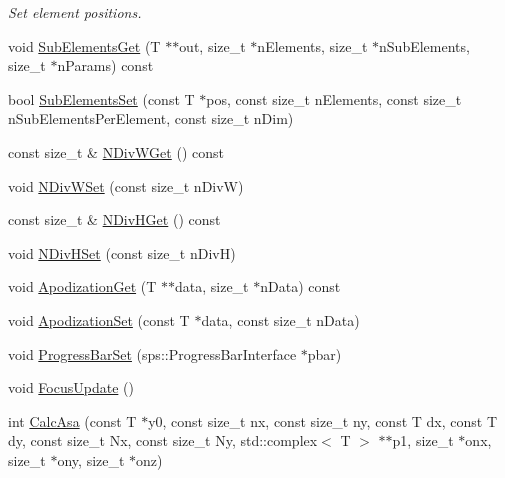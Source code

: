 \begin{DoxyCompactItemize}
\begin{DoxyCompactList}\small\item\em Set element positions. \end{DoxyCompactList}\item 
void \hyperlink{classfnm_1_1Aperture_abaa41240b00a74b090b718872a44fac8}{Sub\+Elements\+Get} (T $\ast$$\ast$out, size\+\_\+t $\ast$n\+Elements, size\+\_\+t $\ast$n\+Sub\+Elements, size\+\_\+t $\ast$n\+Params) const 
\item 
bool \hyperlink{classfnm_1_1Aperture_abeee1842f9d811720380ee3ba3f059f5}{Sub\+Elements\+Set} (const T $\ast$pos, const size\+\_\+t n\+Elements, const size\+\_\+t n\+Sub\+Elements\+Per\+Element, const size\+\_\+t n\+Dim)
\item 
const size\+\_\+t \& \hyperlink{classfnm_1_1Aperture_a67496fa5642e3becc2531aa0bee54041}{N\+Div\+W\+Get} () const 
\item 
void \hyperlink{classfnm_1_1Aperture_a85ddb5a2c36e41d4b2b4714372abe931}{N\+Div\+W\+Set} (const size\+\_\+t n\+Div\+W)
\item 
const size\+\_\+t \& \hyperlink{classfnm_1_1Aperture_a60d4b397ce55604848f2b8b92ce23f51}{N\+Div\+H\+Get} () const 
\item 
void \hyperlink{classfnm_1_1Aperture_aa01cd8acfe2f084f20172afb68c2983a}{N\+Div\+H\+Set} (const size\+\_\+t n\+Div\+H)
\item 
void \hyperlink{classfnm_1_1Aperture_a289829b660a5ef3e4cdf4bbbae5d9dbf}{Apodization\+Get} (T $\ast$$\ast$data, size\+\_\+t $\ast$n\+Data) const 
\item 
void \hyperlink{classfnm_1_1Aperture_a6ec932bbf0a8cc4d51df50f54f9dced0}{Apodization\+Set} (const T $\ast$data, const size\+\_\+t n\+Data)
\item 
void \hyperlink{classfnm_1_1Aperture_af409f86faed17c9b7f2cf098ec4ba9e8}{Progress\+Bar\+Set} (sps\+::\+Progress\+Bar\+Interface $\ast$pbar)
\item 
void \hyperlink{classfnm_1_1Aperture_a9508a8d8cebc92f46019929e14f288b3}{Focus\+Update} ()
\item 
int \hyperlink{classfnm_1_1Aperture_a10975da23ed3050191c892cd54b7e3f3}{Calc\+Asa} (const T $\ast$y0, const size\+\_\+t nx, const size\+\_\+t ny, const T dx, const T dy, const size\+\_\+t Nx, const size\+\_\+t Ny, std\+::complex$<$ T $>$ $\ast$$\ast$p1, size\+\_\+t $\ast$onx, size\+\_\+t $\ast$ony, size\+\_\+t $\ast$onz)
\end{DoxyCompactItemize}
{\bf }\par

